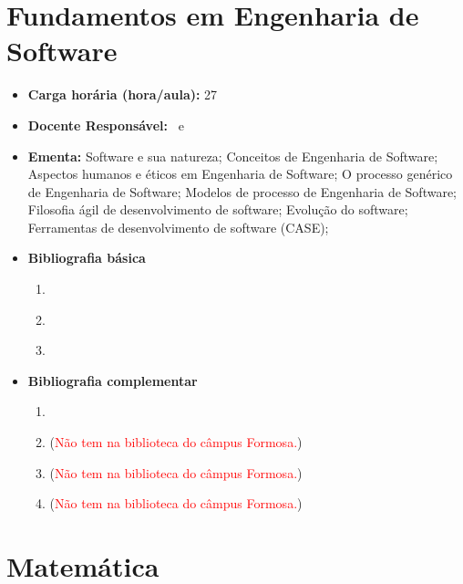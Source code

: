 \documentclass[11pt,fleqn]{book} %
\begin{document}
\section{Fundamentos em Engenharia de Software}\label{disc:engsof}
\begin{itemize}
	\item \textbf{Carga horária (hora/aula):} 27
	\item \textbf{Docente Responsável:}~ e 
	\item \textbf{Ementa:} 
	Software e sua natureza;
	Conceitos de Engenharia de Software;
	Aspectos humanos e éticos em Engenharia de Software;
	O processo genérico de Engenharia de Software;
	Modelos de processo de Engenharia de Software;
	Filosofia ágil de desenvolvimento de software;
	Evolução do software;
	Ferramentas de desenvolvimento de software (CASE);
	\item \textbf{Bibliografia básica}
	\begin{enumerate}
		\item \cite{sommerville2011engenharia}
		\item \cite{pressman2016engenharia}
		\item \cite{de2003engenharia}
	\end{enumerate}
	\item \textbf{Bibliografia complementar}
	\begin{enumerate}
		\item ~\cite{wazlawick2011analise}
		\item \cite{prikladnicki2014metodos}(\textcolor{red}{Não tem na biblioteca do câmpus Formosa.})
		\item \cite{hirama2012engenharia}(\textcolor{red}{Não tem na biblioteca do câmpus Formosa.})
		\item \cite{engholm2010engenharia}(\textcolor{red}{Não tem na biblioteca do câmpus Formosa.})
	\end{enumerate} 
\end{itemize}


\newpage
\section{Matemática}\label{disc:matematica}
\end{document}
